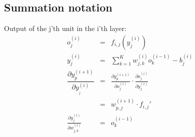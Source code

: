 \documentclass{article}
\newcommand{\cdummy}{\cdot}
\begin{document}
\subsection{Summation notation}

Output of the j'th unit in the i'th layer:
\begin{eqnarray*}
  o_{j}^{( i )} & = & f_{i,j} ( y^{( i )}_{j} )\\
  y^{( i )}_{j} & = & \sum^{K}_{k=1} w_{j,k}^{( i )} o_{k}^{( i-1 )} -b_{j}^{(
  i )}\\
  \dfrac{\partial y_{p}^{( i+1 )}}{\partial y_{_{j}}^{( i )}} & = &
  \frac{\partial y_{p}^{( i+1 )}}{\partial o_{j}^{( i )}} \cdummy
  \frac{\partial o_{j}^{( i )}}{\partial y_{j}^{( i )}}\\
  & = & w^{( i+1 )}_{p,j} \cdummy f_{i,j}'\\
  \frac{\partial y_{j}^{( i )}}{\partial w_{j,k}^{( i )}} & = & o^{( i-1
  )}_{k}
\end{eqnarray*}
\end{document}
